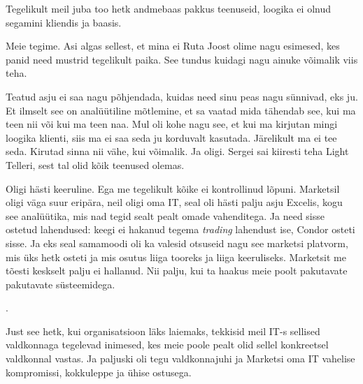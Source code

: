 
Tegelikult meil  juba too hetk andmebaas pakkus teenuseid, loogika ei olnud segamini kliendis ja baasis. 


Meie tegime. Asi algas  sellest, et mina ei Ruta Joost olime nagu esimesed, kes panid need mustrid tegelikult paika. See tundus kuidagi nagu ainuke võimalik viis teha. 


Teatud asju ei saa nagu põhjendada, kuidas need sinu peas nagu sünnivad, eks ju. Et ilmselt see on analüütiline mõtlemine, et sa vaatad mida tähendab see, kui ma teen nii või kui ma teen naa. Mul oli kohe nagu see, et kui ma kirjutan mingi loogika klienti, siis ma ei saa seda ju korduvalt kasutada. Järelikult ma ei tee seda. Kirutad sinna nii vähe, kui võimalik. Ja oligi. Sergei sai kiiresti teha Light Telleri, sest tal olid kõik teenused  olemas. 


Oligi hästi keeruline. Ega me tegelikult kõike ei kontrollinud lõpuni. Marketsil oligi  väga suur eripära, neil oligi oma IT, seal oli hästi palju asju Excelis, kogu see analüütika, mis nad tegid sealt pealt omade vahenditega. Ja need sisse ostetud lahendused: keegi ei hakanud tegema \emph{trading} lahendust ise, Condor osteti sisse. Ja eks seal samamoodi oli ka valesid otsuseid nagu see marketsi platvorm, mis üks hetk osteti ja mis osutus liiga tooreks ja liiga keeruliseks. Marketsit me tõesti keskselt palju ei hallanud. Nii palju, kui ta haakus meie poolt pakutavate  pakutavate süsteemidega. 

. 

Just see hetk, kui organisatsioon läks  laiemaks, tekkisid meil IT-s sellised valdkonnaga tegelevad inimesed, kes meie poole pealt olid sellel konkreetsel valdkonnal vastas. Ja paljuski oli tegu valdkonnajuhi ja Marketsi oma IT vahelise kompromissi, kokkuleppe ja ühise ostusega. 

